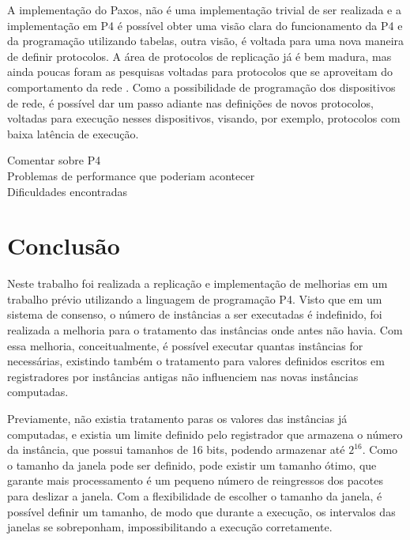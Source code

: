 \documentclass[
    12pt,
    openright, 
    oneside,
    a4paper,
    french,
    english,
    brazil
    ]{facom-ufu-abntex2}
\theoremstyle{definition}
\begin{document}
A implementação do Paxos, não é uma implementação trivial de ser realizada e a implementação em P4 é possível obter uma visão clara
do funcionamento da P4 e da programação utilizando tabelas, outra visão, é voltada para uma nova maneira de definir protocolos. A área
de protocolos de replicação já é bem madura, mas ainda poucas foram as pesquisas voltadas para protocolos que se aproveitam do comportamento
da rede \cite{dang2016paxos}. Como a possibilidade de programação dos dispositivos de rede, é possível dar um passo adiante nas 
definições de novos protocolos, voltadas para execução nesses dispositivos, visando, por exemplo, protocolos com baixa latência
de execução.


\begin{center}
    Comentar sobre P4\\
    Problemas de performance que poderiam acontecer\\
    Dificuldades encontradas \\
\end{center}

\chapter{Conclusão}
Neste trabalho foi realizada a replicação e implementação de melhorias em um trabalho prévio \cite{dang2016paxos} utilizando
a linguagem de programação P4. Visto que em um sistema de consenso, o número de instâncias a ser executadas é indefinido, foi realizada
a melhoria para o tratamento das instâncias onde antes não havia. Com essa melhoria, conceitualmente, é possível executar
quantas instâncias for necessárias, existindo também o tratamento para valores definidos escritos em registradores por instâncias
antigas não influenciem nas novas instâncias computadas.

Previamente, não existia tratamento paras os valores das instâncias já computadas, e existia um limite definido pelo registrador
que armazena o número da instância, que possui tamanhos de 16 bits, podendo armazenar até $2^{16}$. Como o tamanho da janela pode
ser definido, pode existir um tamanho ótimo, que garante mais processamento é um pequeno número de reingressos dos pacotes para
deslizar a janela. Com a flexibilidade de escolher o tamanho da janela, é possível definir um tamanho, de modo que durante a execução,
os intervalos das janelas se sobreponham, impossibilitando a execução corretamente.
\end{document}
